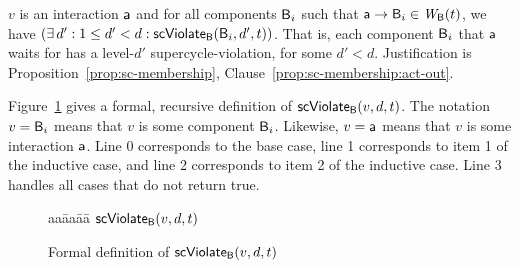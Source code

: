 \item \label{def:supercycle.violation.interaction.out}
$v$ is an interaction $\mathsf{a}$ and for all components $\mathsf{B}_i$ such that $\mathsf{a} \rightarrow \mathsf{B}_i \in \mathit{W}_{\mathsf{B}}({t})$, we have $(\exists\, d' : 1 \le d' < d: \mathsf{scViolate}_{\mathsf{B}}(\mathsf{B}_i,d',t))$.
That is, each component $\mathsf{B}_i$ that $\mathsf{a}$ waits for has a level-$d'$ supercycle-violation, for some $d' < d$.
Justification is Proposition~\ref{prop:sc-membership}, Clause~\ref{prop:sc-membership:act-out}.

\en
\ed
%
Figure~\ref{fig:scViolate} gives a formal, recursive definition of $\mathsf{scViolate}_{\mathsf{B}}(v,d,t)$. 
The notation $v = \mathsf{B}_i$ means that $v$ is some component $\mathsf{B}_i$. Likewise, 
$v = \mathsf{a}$ means that $v$ is some interaction $\mathsf{a}$.
Line 0 corresponds to the base case, line 1 corresponds to item 1 of the inductive case, and line 2 corresponds to item 2 of the inductive case.
Line 3 handles all cases that do not return true.




\begin{figure}[ht]

\setcounter{lctr}{-1}
\begin{tabbing}\label{alg:check-scViol}
aa\= aa\= aa\= \kill
$\mathsf{scViolate}_{\mathsf{B}}(v,d,t)$\\
\end{tabbing}
\vspace{-6ex}
\caption{Formal definition of $\mathsf{scViolate}_{\mathsf{B}}(v,d,t)$}
\label{fig:scViolate}
\end{figure}







